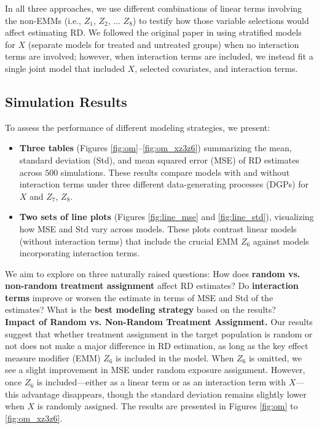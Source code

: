 \documentclass[12pt,oneside]{amsart}
\theoremstyle{definition}
\theoremstyle{remark}
\numberwithin{equation}{section}
\begin{document}
In all three approaches, we use different combinations of linear terms involving the non-EMMs (i.e., $Z_1$, $Z_2$, ... $Z_8$) to testify how those variable selections would affect estimating RD. We followed the original paper in using stratified models for $X$ (separate models for treated and untreated groups) when no interaction terms are involved; however, when interaction terms are included, we instead fit a single joint model that included $X$, selected covariates, and interaction terms.


\subsection{Simulation Results}
To assess the performance of different modeling strategies, we present:
\begin{itemize}
    \item \textbf{Three tables} (Figures \ref{fig:om}--\ref{fig:om_xz3z6}) summarizing the mean, standard deviation (Std), and mean squared error (MSE) of RD estimates across $500$ simulations. These results compare models with and without interaction terms under three different data-generating processes (DGPs) for $X$ and $Z_7$, $Z_8$.
    \item \textbf{Two sets of line plots} (Figures \ref{fig:line_mse} and \ref{fig:line_std}), visualizing how MSE and Std vary across models. These plots contrast linear models (without interaction terms) that include the crucial EMM $Z_6$ against models incorporating interaction terms.
\end{itemize}
We aim to explore on three naturally raised questions: How does \textbf{random vs. non-random treatment assignment} affect RD estimates? Do \textbf{interaction terms} improve or worsen the estimate in terms of MSE and Std of the estimates? What is the \textbf{best modeling strategy} based on the results?
\\

\textbf{Impact of Random vs. Non-Random Treatment Assignment.}
Our results suggest that whether treatment assignment in the target population is random or not does not make a major difference in RD estimation, as long as the key effect measure modifier (EMM) \( Z_6 \) is included in the model. When \( Z_6 \) is omitted, we see a slight improvement in MSE under random exposure assignment. However, once \( Z_6 \) is included—either as a linear term or as an interaction term with \( X \)—this advantage disappears, though the standard deviation remains slightly lower when \( X \) is randomly assigned. The results are presented in Figures \ref{fig:om}
to \ref{fig:om_xz3z6}. 
\end{document}
